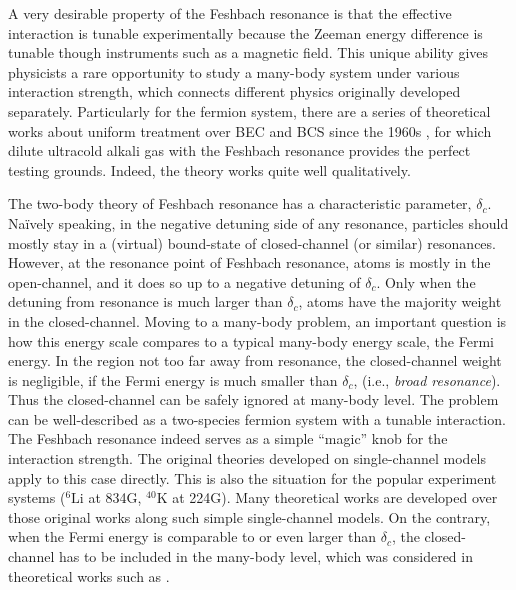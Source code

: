 A very desirable property of the Feshbach resonance is that the effective interaction is tunable experimentally because the Zeeman energy difference is tunable though  instruments such as a magnetic field.  
This unique ability gives physicists a rare opportunity to study  a many-body system under various interaction strength, which connects different physics originally developed separately.  Particularly for the fermion system, there are a series of  theoretical works about uniform treatment over BEC and BCS since the 1960s \cite{Eagle,LeggettCrossover,Nozieres,RanderiaBEC}, for which dilute ultracold alkali gas with the Feshbach resonance provides the perfect testing grounds.  Indeed,  the theory works quite well  qualitatively.  



  The two-body theory of Feshbach resonance has a characteristic  parameter, $\delta_c$.  Na\"{i}vely speaking, in the negative detuning side of any resonance, particles should mostly stay  in a (virtual) bound-state of closed-channel (or similar) resonances.  However, at the resonance point  of Feshbach resonance, atoms is mostly in the open-channel, and it does so up to a negative detuning of $\delta_c$. Only when the detuning from resonance is much larger than $\delta_c$, atoms have the majority weight in the closed-channel.    Moving to a many-body problem, an important question is how this energy scale compares to a typical many-body energy scale, the Fermi energy. In the region not too far away from resonance, the closed-channel weight is negligible, if the Fermi energy is much smaller than $\delta_c$, (i.e., \emph{broad resonance}).   Thus the closed-channel can be safely ignored at many-body level. The problem can be well-described as a two-species fermion system with a tunable interaction.  The Feshbach resonance indeed serves as a simple ``magic'' knob for the interaction strength.  The original  theories developed on  single-channel models  apply to this case directly.  This is also the situation for the popular experiment systems (${}^{6}\text{Li}$ at 834G, $^{40}\text{K}$ at 224G).   Many theoretical works are developed over those original works along such simple single-channel models. On the contrary, when the Fermi energy is  comparable to or even larger than $\delta_c$, the closed-channel has to be included in the many-body level, which was considered in  theoretical works such as \cite{GurarieNarrow}. 
  
